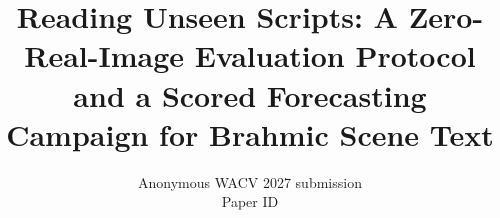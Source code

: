 \documentclass[10pt,twocolumn,letterpaper]{article}
\title{Reading Unseen Scripts: A Zero-Real-Image Evaluation Protocol\\and a Scored Forecasting Campaign for Brahmic Scene Text}
\author{Anonymous WACV 2027 submission\\Paper ID \wacvPaperID}
\begin{document}
\maketitle







{
    \small
    
    
}
\end{document}
